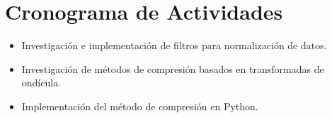 \section{Cronograma de Actividades}

\begin{itemize}
   \item Investigación e implementación de filtros para normalización de datos.
   \item Investigación de métodos de compresión basados en transformadas de ondícula.
   \item Implementación del método de compresión en Python.
\end{itemize}
